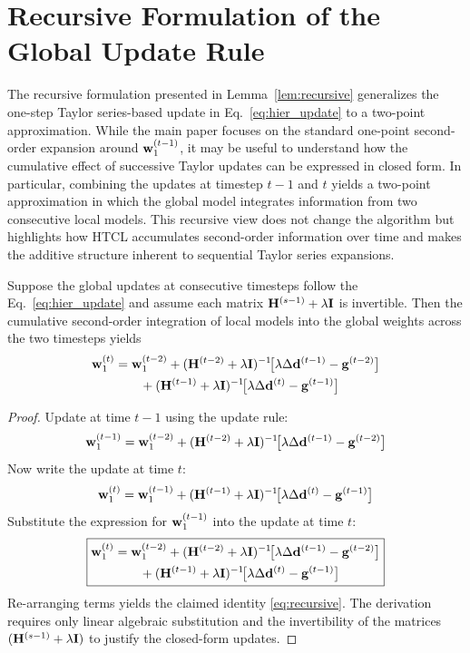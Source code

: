 \section{Recursive Formulation of the Global Update Rule}
\label{app:recursive}

The recursive formulation presented in Lemma~\ref{lem:recursive} generalizes the one-step Taylor series-based update in Eq.~\eqref{eq:hier_update} to a two-point approximation. While the main paper focuses on the standard one-point second-order expansion around $\mathbf{w}_{1}^{(t-1)}$, it may be  useful to understand how the cumulative effect of successive Taylor updates can be expressed in closed form. In particular, combining the updates at timestep $t-1$ and $t$ yields a two-point approximation in which the global model integrates information from two consecutive local models. This recursive view does not change the algorithm but highlights how HTCL accumulates second-order information over time and makes the additive structure inherent to sequential Taylor series expansions. 

\begin{lemma}
\label{lem:recursive}
Suppose the global updates at consecutive timesteps follow the Eq.~\eqref{eq:hier_update} and assume each matrix $\mathbf{H}^{(s-1)}+\lambda \mathbf{I}$ is invertible. Then the cumulative second-order integration of local models into the global weights across the two timesteps yields
\begin{equation}
\label{eq:recursive}
\begin{aligned}
\mathbf{w}_{1}^{(t)} 
&= \mathbf{w}_{1}^{(t-2)} 
+ (\mathbf{H}^{(t-2)} + \lambda \mathbf{I})^{-1}\!\big[\lambda \Delta\mathbf{d}^{(t-1)} - \mathbf{g}^{(t-2)}\big] \\
&\qquad + (\mathbf{H}^{(t-1)} + \lambda \mathbf{I})^{-1}\!\big[\lambda \Delta\mathbf{d}^{(t)} - \mathbf{g}^{(t-1)}\big]
\end{aligned}
\end{equation}
\end{lemma}

\begin{proof}
Update at time $t-1$ using the update rule:
\[
\mathbf{w}_{1}^{(t-1)} = \mathbf{w}_{1}^{(t-2)} + (\mathbf{H}^{(t-2)}+\lambda \mathbf{I})^{-1}\!\big[\lambda \Delta\mathbf{d}^{(t-1)} - \mathbf{g}^{(t-2)}\big]
\]
Now write the update at time $t$:
\[
\mathbf{w}_{1}^{(t)} = \mathbf{w}_{1}^{(t-1)} + (\mathbf{H}^{(t-1)}+\lambda \mathbf{I})^{-1}\!\big[\lambda \Delta\mathbf{d}^{(t)} - \mathbf{g}^{(t-1)}\big]
\]
Substitute the expression for $\mathbf{w}_{1}^{(t-1)}$ into the update at time $t$:
\[
\boxed{
\begin{aligned}
\mathbf{w}_{1}^{(t)}
&= \mathbf{w}_{1}^{(t-2)} + (\mathbf{H}^{(t-2)}+\lambda \mathbf{I})^{-1}\!\big[\lambda \Delta\mathbf{d}^{(t-1)} - \mathbf{g}^{(t-2)}\big] \\
&\qquad + (\mathbf{H}^{(t-1)}+\lambda \mathbf{I})^{-1}\!\big[\lambda \Delta\mathbf{d}^{(t)} - \mathbf{g}^{(t-1)}\big]
\end{aligned}
}
\]
Re-arranging terms yields the claimed identity \eqref{eq:recursive}. The derivation requires only linear algebraic substitution and the invertibility of the matrices $(\mathbf{H}^{(s-1)}+\lambda \mathbf{I})$ to justify the closed-form updates. 
\end{proof}

